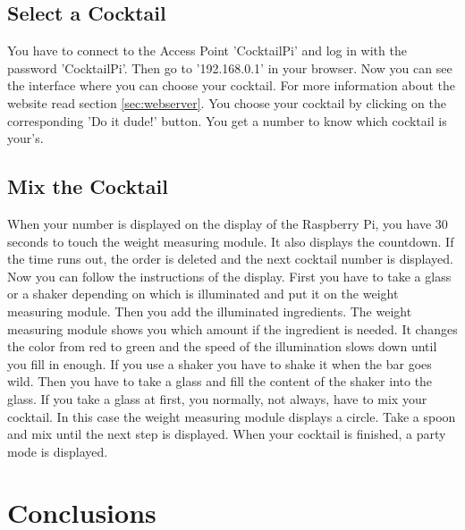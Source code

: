 \documentclass{acm_proc_article-sp}
\begin{document}
 \subsection{Select a Cocktail}
You have to connect to the Access Point 'CocktailPi' and log in with the password 'CocktailPi'. Then go to '192.168.0.1' in your browser. Now you can see the interface where you can choose your cocktail. For more information about the website read section \ref{sec:webserver}. You choose your cocktail by clicking on the corresponding 'Do it dude!' button. You get a number to know which cocktail is your's.
 \subsection{Mix the Cocktail}
When your number is displayed on the display of the Raspberry Pi, you have 30 seconds to touch the weight measuring module. It also displays the countdown. If the time runs out, the order is deleted and the next cocktail number is displayed. \\
Now you can follow the instructions of the display. First you have to take a glass or a shaker depending on which is illuminated and put it on the weight measuring module. Then you add the illuminated ingredients. The weight measuring module shows you which amount if the ingredient is needed. It changes the color from red to green and the speed of the illumination slows down until you fill in enough. If you use a shaker you have to shake it when the bar goes wild. Then you have to take a glass and fill the content of the shaker into the glass. If you take a glass at first, you normally, not always, have to mix your cocktail. In this case the weight measuring module displays a circle. Take a spoon and mix until the next step is displayed. When your cocktail is finished, a party mode is displayed. 


\section{Conclusions}
\end{document}
